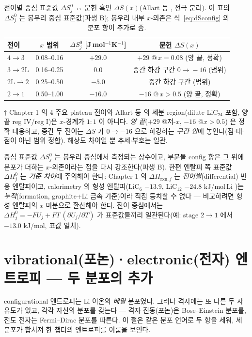 \documentclass[11pt,a4paper]{article}
\newcommand{\rxn}{\mathrm{rxn}}
\begin{document}
\begin{table}[t]
\centering\small
\renewcommand{\arraystretch}{1.2}
\caption{전이별 중심 표준값 $\Delta S^0_j$ ↔ 문헌 흑연 $\Delta S(x)$(Allart 등 \cite{allart2018}, 전극 분리). 이 표의 $\Delta S^0_j$ 는 봉우리 중심 표준값(파생 B); 봉우리 내부 $x$-의존은 식~\eqref{eq:dSconfig} 의 분포 항이 추가로 줌.}
\label{tab:ds}
\begin{tabular}{l c c c}
\toprule
전이 & $x$ 범위 & $\Delta S^0_j$ [J\,mol$^{-1}$K$^{-1}$] & 문헌 $\Delta S(x)$ \\
\midrule
$4\!\to\!3$ & 0.08–0.16 & $+29.0$ & $+29$ @\,$x{=}0.08$ (양 끝, 정확) \\
$3\!\to\!2\mathrm L$ & 0.16–0.25 & $0.0$ & 중간 하강 구간 $0\!\to\!-16$ (범위) \\
$2\mathrm L\!\to\!2$ & 0.25–0.50 & $-5.0$ & 중간 하강 구간 (범위) \\
$2\!\to\!1$ & 0.50–1.00 & $-16.0$ & $-16$ @\,$x{>}0.5$ (양 끝, 정확) \\
\bottomrule
\end{tabular}

\smallskip
{\footnotesize $\dagger$ Chapter 1 의 4 주요 plateau 전이와 Allart 등 \cite{allart2018} 의 세분 region(dilute
LiC$_{24}$ 포함, 양 끝 reg IV/reg I)은 $x$-경계가 $1{:}1$ 이 아니다. \emph{양 끝}($+29$ @저-$x$, $-16$ @$x{>}0.5$)
은 정확 대응하고, 중간 두 전이는 $\Delta S$ 가 $0\to-16$ 으로 하강하는 \emph{구간 안}에 놓인다(점-대-점이 아닌
범위 정합). 해상도 차이일 뿐 추세$\cdot$부호는 일관.}
\end{table}

중심 표준값 $\Delta S^0_j$ 는 봉우리 중심에서 측정되는 상수이고, 부분몰 config 항은 그 위에 분포가 더하는
$x$-의존이라는 점을 다시 강조한다(파생 B). 한편 엔탈피 쪽 표준값 $\Delta H^0_j$ 는 \emph{기준 차이}에 주의해야
한다: Chapter 1 의 $\Delta H_{\rxn,j}$ 는 \emph{전이별}(differential) 반응 엔탈피이고, calorimetry 의 형성
엔탈피(LiC$_6$ $-13.9$, LiC$_{12}$ $-24.8$ kJ/mol\,Li \cite{chemmater2015})는 \emph{누적}(formation,
graphite+Li 금속 기준)이라 직접 등치할 수 없다 — 비교하려면 형성 엔탈피의 $x$-미분으로 환산해야 한다. 전이
중심에서는 $\Delta H^0_j=-FU_j+FT\,(\partial U_j/\partial T)$ 가 표준값들끼리 일관된다(예: stage $2\to1$ 에서
$-13.0$ kJ/mol, 표값 일치).

\section{vibrational(포논)·electronic(전자) 엔트로피 — 두 분포의 추가}\label{sec:vibel}
configurational 엔트로피는 Li 이온의 \emph{배열} 분포였다. 그러나 격자에는 또 다른 두 자유도가 있고, 각각
자신의 분포를 갖는다 — 격자 진동(포논)은 Bose--Einstein 분포를, 전도 전자는 Fermi--Dirac 분포를 따른다.
이 절은 같은 분포 언어로 두 항을 세워, 세 분포가 합쳐져 한 챕터의 엔트로피를 이룸을 보인다.
\end{document}
